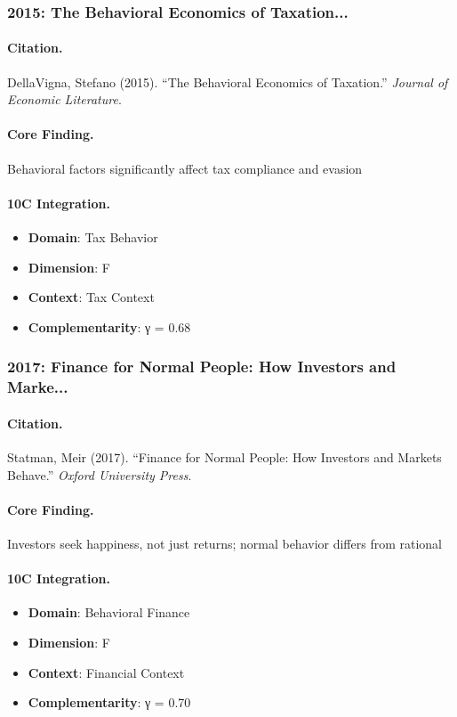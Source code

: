 \subsubsection{2015: The Behavioral Economics of Taxation...}

\paragraph{Citation.}
DellaVigna, Stefano (2015). ``The Behavioral Economics of Taxation.''
\textit{Journal of Economic Literature}.

\paragraph{Core Finding.}
Behavioral factors significantly affect tax compliance and evasion

\paragraph{10C Integration.}
\begin{itemize}[nosep]
  \item \textbf{Domain}: Tax Behavior
  \item \textbf{Dimension}: F
  \item \textbf{Context}: Tax Context
  \item \textbf{Complementarity}: γ = 0.68
\end{itemize}

\subsubsection{2017: Finance for Normal People: How Investors and Marke...}

\paragraph{Citation.}
Statman, Meir (2017). ``Finance for Normal People: How Investors and Markets Behave.''
\textit{Oxford University Press}.

\paragraph{Core Finding.}
Investors seek happiness, not just returns; normal behavior differs from rational

\paragraph{10C Integration.}
\begin{itemize}[nosep]
  \item \textbf{Domain}: Behavioral Finance
  \item \textbf{Dimension}: F
  \item \textbf{Context}: Financial Context
  \item \textbf{Complementarity}: γ = 0.70
\end{itemize}

